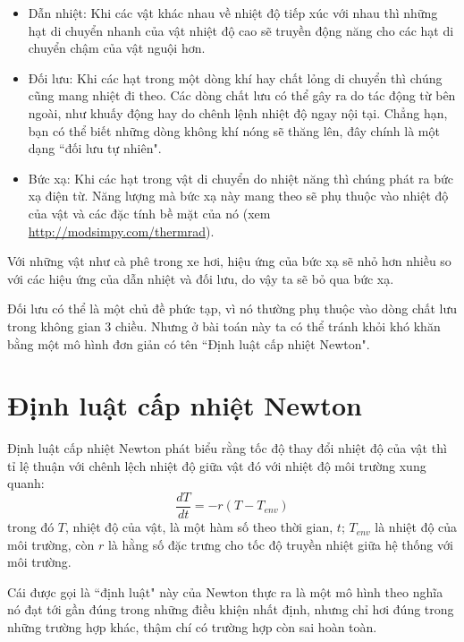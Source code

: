 \documentclass[12pt]{book}
\theoremstyle{exercise}
\begin{document}
\begin{itemize}

\item Dẫn nhiệt: Khi các vật khác nhau về nhiệt độ tiếp xúc với nhau thì những hạt di chuyển nhanh của vật nhiệt độ cao sẽ truyền động năng cho các hạt di chuyển chậm của vật nguội hơn.

\item Đối lưu: Khi các hạt trong một dòng khí hay chất lỏng di chuyển thì chúng cũng mang nhiệt đi theo. Các dòng chất lưu có thể gây ra do tác động từ bên ngoài, như khuấy động hay do chênh lệnh nhiệt độ ngay nội tại. Chẳng hạn, bạn có thể biết những dòng không khí nóng sẽ thăng lên, đây chính là một dạng ``đối lưu tự nhiên".


\item Bức xạ: Khi các hạt trong vật di chuyển do nhiệt năng thì chúng phát ra bức xạ điện từ. Năng lượng mà bức xạ này mang theo sẽ phụ thuộc vào nhiệt độ của vật và các đặc tính bề mặt của nó (xem \url{http://modsimpy.com/thermrad}).

\end{itemize}

Với những vật như cà phê trong xe hơi, hiệu ứng của bức xạ sẽ nhỏ hơn nhiều so với các hiệu ứng của dẫn nhiệt và đối lưu, do vậy ta sẽ bỏ qua bức xạ.

Đối lưu có thể là một chủ đề phức tạp, vì nó thường phụ thuộc vào dòng chất lưu trong không gian 3 chiều. Nhưng ở bài toán này ta có thể tránh khỏi khó khăn bằng một mô hình đơn giản có tên ``Định luật cấp nhiệt Newton".


\section{Định luật cấp nhiệt Newton}

Định luật cấp nhiệt Newton phát biểu rằng tốc độ thay đổi nhiệt độ của vật thì tỉ lệ thuận với chênh lệch nhiệt độ giữa vật đó với nhiệt độ môi trường xung quanh:
%
\[ \frac{dT}{dt} = -r (T - T_{env}) \]
%
trong đó $T$, nhiệt độ của vật, là một hàm số theo thời gian, $t$; $T_{env}$ là nhiệt độ của môi trường, còn $r$ là hằng số đặc trưng cho tốc độ truyền nhiệt giữa hệ thống với môi trường.

Cái được gọi là ``định luật" này của Newton thực ra là một mô hình theo nghĩa nó đạt tới gần đúng trong những điều khiện nhất định, nhưng chỉ hơi đúng trong những trường hợp khác, thậm chí có trường hợp còn sai hoàn toàn.
\end{document}
